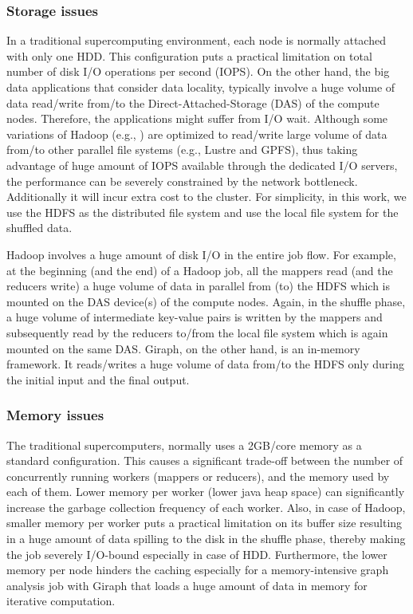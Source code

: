 \documentclass[10pt, conference, compsocconf]{IEEEtran}
\begin{document}
\subsubsection {Storage issues}
In a traditional supercomputing environment, each node is normally attached with only one HDD. This configuration puts a practical limitation on total number of disk I/O operations per second (IOPS). On the other hand, the big data applications that consider data locality, typically involve a huge volume of data read/write from/to the Direct-Attached-Storage (DAS) of the compute nodes. Therefore, the applications might suffer from I/O wait. Although some variations of Hadoop (e.g., \cite{fw:myhadoop}) are optimized to read/write large volume of data from/to other parallel file systems (e.g., Lustre and GPFS), thus taking advantage of huge amount of IOPS available through the dedicated I/O servers, the performance can be severely constrained by the network bottleneck. Additionally it will incur extra cost to the cluster. For simplicity, in this work, we use the HDFS as the distributed file system and use the local file system for the shuffled data.

Hadoop involves a huge amount of disk I/O in the entire job flow. For example, at the beginning (and the end) of a Hadoop job, all the mappers read (and the reducers write) a huge volume of data in parallel from (to) the HDFS which is mounted on the DAS device(s) of the compute nodes. Again, in the shuffle phase, a huge volume of intermediate key-value pairs is written by the mappers and subsequently read by the reducers to/from the local file system which is again mounted on the same DAS. Giraph, on the other hand, is an in-memory framework. It reads/writes a huge volume of data from/to the HDFS only during the initial input and the final output.
\subsubsection {Memory issues}
The traditional supercomputers, normally uses a 2GB/core memory as a standard configuration. This causes a significant trade-off between the number of concurrently running workers (mappers or reducers), and the memory used by each of them. Lower memory per worker (lower java heap space) can significantly increase the garbage collection frequency of each worker. Also, in case of Hadoop, smaller memory per worker puts a practical limitation on its buffer size resulting in a huge amount of data spilling to the disk in the shuffle phase, thereby making the job severely I/O-bound especially in case of HDD. Furthermore, the lower memory per node hinders the caching especially for a memory-intensive graph analysis job with Giraph that loads a huge amount of data in memory for iterative computation.
\end{document}
